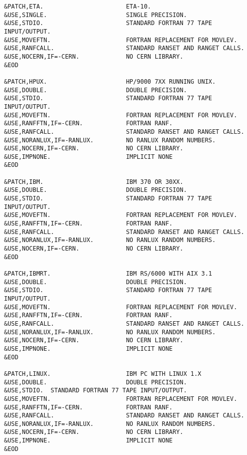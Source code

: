 \begin{verbatim}
&PATCH,ETA.                       ETA-10.
&USE,SINGLE.                      SINGLE PRECISION.
&USE,STDIO.                       STANDARD FORTRAN 77 TAPE INPUT/OUTPUT.
&USE,MOVEFTN.                     FORTRAN REPLACEMENT FOR MOVLEV.
&USE,RANFCALL.                    STANDARD RANSET AND RANGET CALLS.
&USE,NOCERN,IF=-CERN.             NO CERN LIBRARY.
&EOD

&PATCH,HPUX.                      HP/9000 7XX RUNNING UNIX.
&USE,DOUBLE.                      DOUBLE PRECISION.
&USE,STDIO.                       STANDARD FORTRAN 77 TAPE INPUT/OUTPUT.
&USE,MOVEFTN.                     FORTRAN REPLACEMENT FOR MOVLEV.
&USE,RANFFTN,IF=-CERN.            FORTRAN RANF.
&USE,RANFCALL.                    STANDARD RANSET AND RANGET CALLS.
&USE,NORANLUX,IF=-RANLUX.         NO RANLUX RANDOM NUMBERS.
&USE,NOCERN,IF=-CERN.             NO CERN LIBRARY.
&USE,IMPNONE.                     IMPLICIT NONE
&EOD

&PATCH,IBM.                       IBM 370 OR 30XX.
&USE,DOUBLE.                      DOUBLE PRECISION.
&USE,STDIO.                       STANDARD FORTRAN 77 TAPE INPUT/OUTPUT.
&USE,MOVEFTN.                     FORTRAN REPLACEMENT FOR MOVLEV.
&USE,RANFFTN,IF=-CERN.            FORTRAN RANF.
&USE,RANFCALL.                    STANDARD RANSET AND RANGET CALLS.
&USE,NORANLUX,IF=-RANLUX.         NO RANLUX RANDOM NUMBERS.
&USE,NOCERN,IF=-CERN.             NO CERN LIBRARY.
&EOD

&PATCH,IBMRT.                     IBM RS/6000 WITH AIX 3.1
&USE,DOUBLE.                      DOUBLE PRECISION.
&USE,STDIO.                       STANDARD FORTRAN 77 TAPE INPUT/OUTPUT.
&USE,MOVEFTN.                     FORTRAN REPLACEMENT FOR MOVLEV.
&USE,RANFFTN,IF=-CERN.            FORTRAN RANF.
&USE,RANFCALL.                    STANDARD RANSET AND RANGET CALLS.
&USE,NORANLUX,IF=-RANLUX.         NO RANLUX RANDOM NUMBERS.
&USE,NOCERN,IF=-CERN.             NO CERN LIBRARY.
&USE,IMPNONE.                     IMPLICIT NONE
&EOD

&PATCH,LINUX.                     IBM PC WITH LINUX 1.X
&USE,DOUBLE.                      DOUBLE PRECISION.
&USE,STDIO.  STANDARD FORTRAN 77 TAPE INPUT/OUTPUT.
&USE,MOVEFTN.                     FORTRAN REPLACEMENT FOR MOVLEV.
&USE,RANFFTN,IF=-CERN.            FORTRAN RANF.
&USE,RANFCALL.                    STANDARD RANSET AND RANGET CALLS.
&USE,NORANLUX,IF=-RANLUX.         NO RANLUX RANDOM NUMBERS.
&USE,NOCERN,IF=-CERN.             NO CERN LIBRARY.
&USE,IMPNONE.                     IMPLICIT NONE
&EOD


\end{verbatim}
